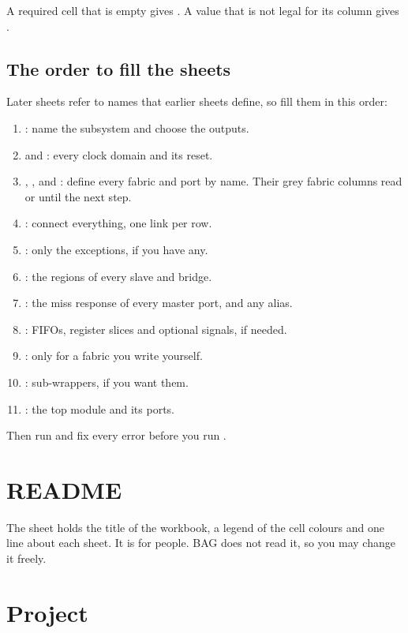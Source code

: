 A required cell that is empty gives . A value that is not legal
for its column gives .

\subsection{The order to fill the sheets}

Later sheets refer to names that earlier sheets define, so fill them in this order:

\begin{enumerate}
\item {}: name the subsystem and choose the outputs.
\item {} and : every clock domain and its reset.
\item {}, ,  and : define every
  fabric and port by name. Their grey fabric columns read  or
   until the next step.
\item {}: connect everything, one link per row.
\item {}: only the exceptions, if you have any.
\item {}: the regions of every slave and bridge.
\item {}: the miss response of every master port, and any alias.
\item {}: FIFOs, register slices and optional signals, if needed.
\item {}: only for a fabric you write yourself.
\item {}: sub-wrappers, if you want them.
\item {}: the top module and its ports.
\end{enumerate}

Then run  and fix every error before you run .

\section{README}

The  sheet holds the title of the workbook, a legend of the cell colours
and one line about each sheet. It is for people. BAG does not read it, so you may change
it freely.

\section{Project}


